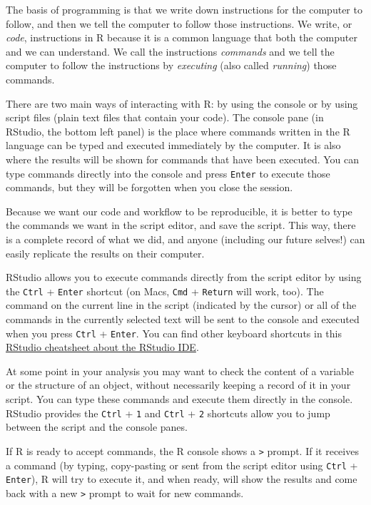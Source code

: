 \documentclass[]{book}
\begin{document}
The basis of programming is that we write down instructions for the
computer to follow, and then we tell the computer to follow those
instructions. We write, or \emph{code}, instructions in R because it is
a common language that both the computer and we can understand. We call
the instructions \emph{commands} and we tell the computer to follow the
instructions by \emph{executing} (also called \emph{running}) those
commands.

There are two main ways of interacting with R: by using the console or
by using script files (plain text files that contain your code). The
console pane (in RStudio, the bottom left panel) is the place where
commands written in the R language can be typed and executed immediately
by the computer. It is also where the results will be shown for commands
that have been executed. You can type commands directly into the console
and press \texttt{Enter} to execute those commands, but they will be
forgotten when you close the session.

Because we want our code and workflow to be reproducible, it is better
to type the commands we want in the script editor, and save the script.
This way, there is a complete record of what we did, and anyone
(including our future selves!) can easily replicate the results on their
computer.

RStudio allows you to execute commands directly from the script editor
by using the \texttt{Ctrl} + \texttt{Enter} shortcut (on Macs,
\texttt{Cmd} + \texttt{Return} will work, too). The command on the
current line in the script (indicated by the cursor) or all of the
commands in the currently selected text will be sent to the console and
executed when you press \texttt{Ctrl} + \texttt{Enter}. You can find
other keyboard shortcuts in this
\href{https://github.com/rstudio/cheatsheets/raw/master/rstudio-ide.pdf}{RStudio
cheatsheet about the RStudio IDE}.

At some point in your analysis you may want to check the content of a
variable or the structure of an object, without necessarily keeping a
record of it in your script. You can type these commands and execute
them directly in the console. RStudio provides the \texttt{Ctrl} +
\texttt{1} and \texttt{Ctrl} + \texttt{2} shortcuts allow you to jump
between the script and the console panes.

If R is ready to accept commands, the R console shows a
\texttt{\textgreater{}} prompt. If it receives a command (by typing,
copy-pasting or sent from the script editor using \texttt{Ctrl} +
\texttt{Enter}), R will try to execute it, and when ready, will show the
results and come back with a new \texttt{\textgreater{}} prompt to wait
for new commands.
\end{document}
